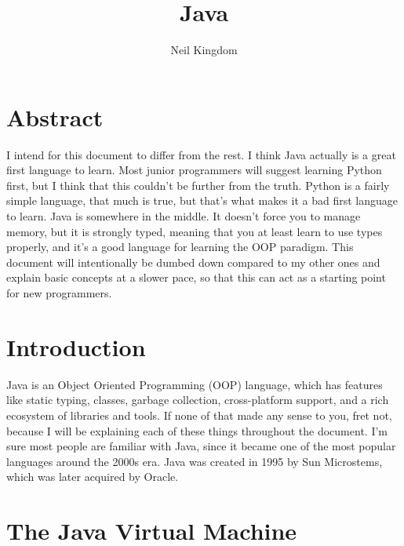 \documentclass{article}
\begin{document}
\renewcommand\maketitlehooka{\vfill}
\renewcommand\maketitlehookd{\vfill}

\begin{titlingpage}
    \title{Java}
    \author{Neil Kingdom}
    \maketitle
\end{titlingpage}

\newpage

\tableofcontents

\newpage

\section{Abstract}

I intend for this document to differ from the rest. I think Java actually is a great first language to learn.
Most junior programmers will suggest learning Python first, but I think that this couldn’t be further from the
truth. Python is a fairly simple language, that much is true, but that’s what makes it a bad first language to
learn. Java is somewhere in the middle. It doesn’t force you to manage memory, but it is strongly typed,
meaning that you at least learn to use types properly, and it’s a good language for learning the OOP paradigm.
This document will intentionally be dumbed down compared to my other ones and explain basic concepts at a
slower pace, so that this can act as a starting point for new programmers.

\section{Introduction}

Java is an Object Oriented Programming (OOP) language, which has features like static typing, classes, garbage
collection, cross-platform support, and a rich ecosystem of libraries and tools. If none of that made any
sense to you, fret not, because I will be explaining each of these things throughout the document. I’m sure
most people are familiar with Java, since it became one of the most popular languages around the 2000s era.
Java was created in 1995 by Sun Microstems, which was later acquired by Oracle.

\section{The Java Virtual Machine}
\end{document}
